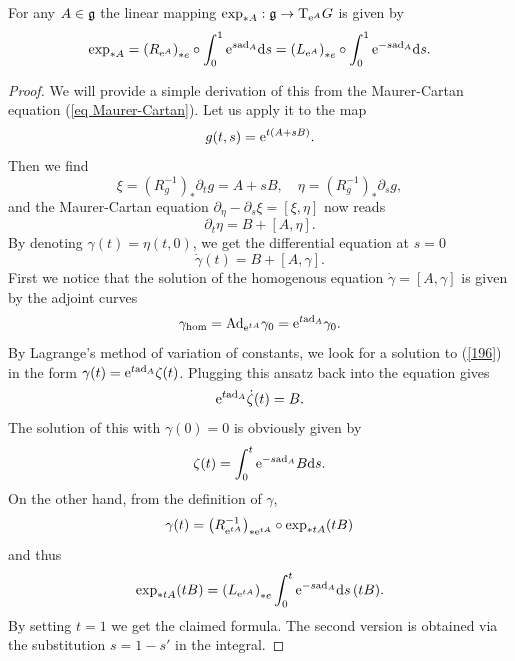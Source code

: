 \begin{thm}[{{\cite[Thm.~1.5.3]{DK}}}]\label{thm differential of exp}
    For any $A\in\mathfrak{g}$ the linear mapping $\exp_{\ast A}:\mathfrak{g}\to \mathrm{T}_{\mathrm{e}^A} G$ is given by
    \[  \exp_{\ast A}=\left(R_{\mathrm{e}^A}\right)_{\ast e}\circ \int_0^1 \mathrm{e}^{s\mathrm{ad}_A}{\mathrm{d}} s=\left(L_{\mathrm{e}^A}\right)_{\ast e}\circ \int_0^1 \mathrm{e}^{-s\mathrm{ad}_A}{\mathrm{d}} s.   \label{eq 1.5.1 DK}\]
\end{thm}
\begin{proof}
    We will provide a simple derivation of this from the Maurer-Cartan equation (\ref{eq Maurer-Cartan}). Let us apply it to the map
    \[g(t,s)=\mathrm{e}^{t(A+sB)}.\]
    Then we find
    \[\xi=\left(R_g^{-1}\right)_\ast \partial_t g=A+sB, \quad \eta=\left(R_g^{-1}\right)_\ast \partial_s g,\]
    and the Maurer-Cartan equation $\partial_\eta-\partial_s\xi=[\xi,\eta]$ now reads
    \[\partial_t \eta=B+[A,\eta].\]
    By denoting $\gamma(t)=\eta(t,0)$, we get the differential equation at $s=0$
    \[\dot\gamma(t)=B+[A,\gamma].\label{196}\]
    First we notice that the solution of the homogenous equation $\dot\gamma=[A,\gamma]$ is given by the adjoint curves
    \[\gamma_{\mathrm{hom}}=\mathrm{Ad}_{\mathrm{e}^{tA}}\gamma_0=\mathrm{e}^{t\mathrm{ad}_A}\gamma_0.\]
    By Lagrange's method of variation of constants, we look for a solution to (\ref{196}) in the form $\gamma(t)=\mathrm{e}^{t\mathrm{ad}_A}\zeta(t)$. Plugging this ansatz back into the equation gives
    \[\mathrm{e}^{t\mathrm{ad}_A}\dot\zeta(t)=B.\]
    The solution of this with $\gamma(0)=0$ is obviously given by
    \[\zeta(t)=\int_0^t \mathrm{e}^{-s\mathrm{ad}_A}B{\mathrm{d}} s.\]
    On the other hand, from the definition of $\gamma$,
    \[\gamma(t)=\left(R_{\mathrm{e}^{tA}}^{-1}\right)_{\ast \mathrm{e}^{tA}}\circ \exp_{\ast tA}(tB)\]
    and thus
    \[\exp_{\ast tA}(tB)=\left(L_{\mathrm{e}^{tA}}\right)_{\ast e}\int_0^t\mathrm{e}^{-s\mathrm{ad}_A}{\mathrm{d}} s\,(tB).\]
    By setting $t=1$ we get the claimed formula. The second version is obtained via the substitution $s=1-s'$ in the integral.
\end{proof}



